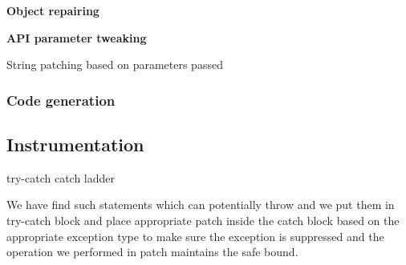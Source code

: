 \begin{mylist}

 \item \textbf{Object repairing}

 \item \textbf{API parameter tweaking}

\begin{algorithm}[t]
\scriptsize
\DontPrintSemicolon
{}
\caption{String patching based on parameters passed}
\label{algo:stringPatchParameter}
\end{algorithm}

\end{mylist}

\subsubsection{Code generation}
\label{sec:tool:stage2:generation}

\subsection{Instrumentation}
\label{sec:tool:stage3}

try-catch
catch ladder

We have find such statements which can potentially throw 
and we put them in try-catch block and place appropriate patch inside the catch
block based on the appropriate exception type to make sure
the exception is suppressed and the operation we performed
in patch maintains the safe bound.


